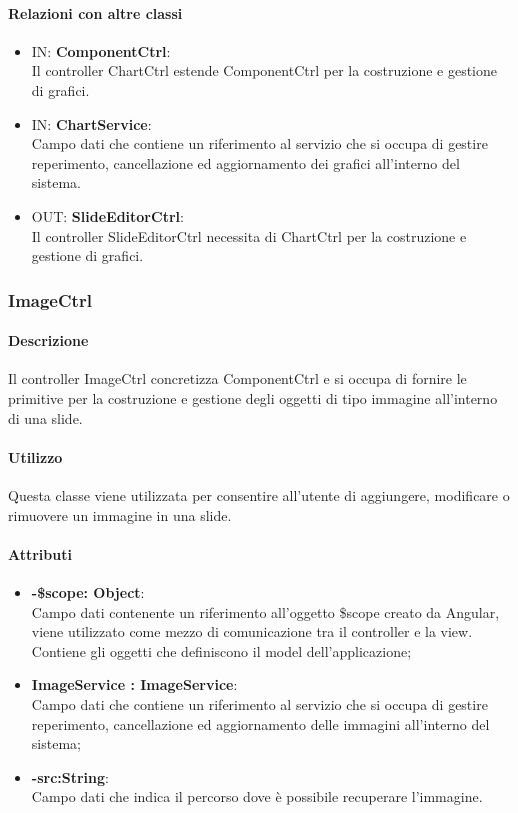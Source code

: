 	\paragraph{Relazioni con altre classi}
	\begin{itemize}
 	\item IN: \textbf{ComponentCtrl}:\\
	 	Il controller ChartCtrl estende ComponentCtrl per la costruzione e gestione di grafici.
	\item IN: \textbf{ChartService}:\\
		Campo dati che contiene un riferimento al servizio che si occupa di gestire reperimento, cancellazione ed aggiornamento dei grafici all'interno del sistema.
 	\item OUT: \textbf{SlideEditorCtrl}:\\
	 	Il controller SlideEditorCtrl necessita di ChartCtrl per la costruzione e gestione di grafici.
	\end{itemize}

\newpage
\subsubsection{ImageCtrl}
   \paragraph{Descrizione}
	Il controller ImageCtrl concretizza ComponentCtrl e si occupa di fornire le primitive per la costruzione e gestione degli oggetti di tipo immagine all'interno di una slide.
		
	\paragraph{Utilizzo}
	Questa classe viene utilizzata per consentire all'utente di aggiungere, modificare o rimuovere un immagine in una slide.
	
	\paragraph{Attributi}
	\begin{itemize}
		\item \textbf{-\$scope: Object}:\\
			Campo dati contenente un riferimento all'oggetto \$scope creato da Angular, viene utilizzato come mezzo di comunicazione tra il controller e la view. Contiene gli oggetti che definiscono il model dell'applicazione;
		\item \textbf{ImageService : ImageService}:\\
			Campo dati che contiene un riferimento al servizio che si occupa di gestire reperimento, cancellazione ed aggiornamento delle immagini all'interno del sistema;
		\item\textbf{-src:String}:\\
			Campo dati che indica il percorso dove è possibile recuperare l'immagine.
	\end{itemize}
	
